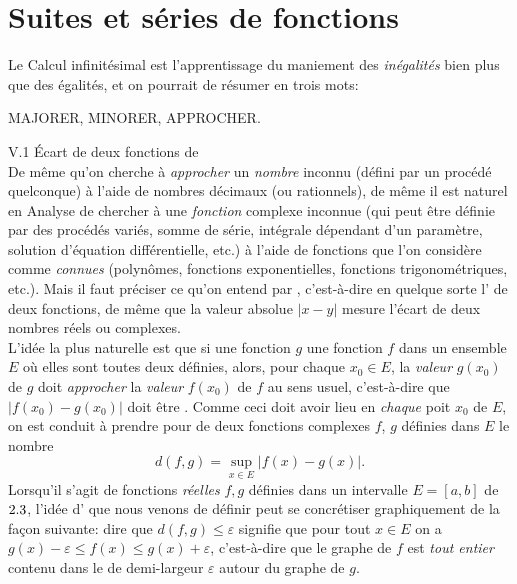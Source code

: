 \chapter{Suites et séries de fonctions}

Le Calcul infinitésimal est l'apprentissage du maniement des \emph{inégalités} bien plus que des égalités, et on pourrait de résumer en trois mots:
\begin{center}
        MAJORER, MINORER, APPROCHER.
\end{center}

V.1 Écart de deux fonctions de \cite{calcul_infinitesimal} \\
De même qu'on cherche à \emph{approcher} un \emph{nombre} inconnu (défini par un procédé quelconque) à l'aide de nombres décimaux (ou rationnels), de même il est naturel en Analyse de chercher à  une \emph{fonction} complexe inconnue (qui peut être définie par des procédés variés, somme de série, intégrale dépendant d'un paramètre, solution d'équation différentielle, etc.) à l'aide de fonctions que l'on considère comme \emph{connues} (polynômes, fonctions exponentielles, fonctions trigonométriques, etc.). Mais il faut préciser ce qu'on entend par , c'est-à-dire  en quelque sorte l' de deux fonctions, de même que la valeur absolue $|x-y|$ mesure l'écart de deux nombres réels ou complexes. \\
L'idée la plus naturelle est que si une fonction $g$  une fonction $f$ dans un ensemble $E$ où elles sont toutes deux définies, alors, pour chaque $x_0 \in E$, la \emph{valeur} $g(x_0)$ de $g$ doit \emph{approcher} la \emph{valeur} $f(x_0)$ de $f$ au sens usuel, c'est-à-dire que $|f(x_0)-g(x_0)|$ doit être . Comme ceci doit avoir lieu en \emph{chaque} poit $x_0$ de $E$, on est conduit à prendre pour  de deux fonctions complexes $f$, $g$ définies dans $E$ le nombre
$$d(f, g) = \sup_{x \in E} |f(x)-g(x)|.$$
Lorsqu'il s'agit de fonctions \emph{réelles} $f, g$ définies dans un intervalle $E = [a, b]$ de $2.3$, l'idée d' que nous venons de définir peut se concrétiser graphiquement de la façon suivante: dire que $d(f,g) \leqslant \varepsilon$ signifie que pour tout $x \in E$ on a $g(x)-\varepsilon \leqslant f(x) \leqslant g(x) + \varepsilon$, c'est-à-dire que le graphe de $f$ est \emph{tout entier} contenu dans le  de demi-largeur $\varepsilon$ autour du graphe de $g$. \\
